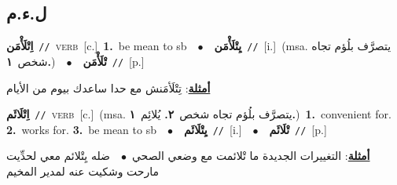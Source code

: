 \documentclass[10pt,a4paper,twoside]{article} %
\begin{document}
\begin{multicols}{2}
\vspace{-3mm}
\subsection*{\color{blue}\foreignlanguage{arabic}{ل.ء.م}\color{blue}{}} 

{\setlength\topsep{0pt}\textbf{\foreignlanguage{arabic}{اِتْلَأْمَن}}\ {\color{gray}\texttt{//}\color{black}}\ \textsc{verb}\ [c.]\ \textbf{1.}~be mean to sb\ \ $\bullet$\ \ \setlength\topsep{0pt}\textbf{\foreignlanguage{arabic}{يِتْلَأْمَن}}\ {\color{gray}\texttt{//}\color{black}}\ [i.]\ \color{gray}(msa. \foreignlanguage{arabic}{يتصرَّف بلُؤم تجاه شخص}~\foreignlanguage{arabic}{\textbf{١.}})\color{black}\ \ $\bullet$\ \ \setlength\topsep{0pt}\textbf{\foreignlanguage{arabic}{تْلَأْمَن}}\ {\color{gray}\texttt{//}\color{black}}\ [p.]\  \begin{flushright}\color{gray}\foreignlanguage{arabic}{\textbf{\underline{\foreignlanguage{arabic}{أمثلة}}}: تِتْلَأمَنش مع حدا ساعدك بيوم من الأيام}\end{flushright}\color{black}} \vspace{2mm}

{\setlength\topsep{0pt}\textbf{\foreignlanguage{arabic}{اِتْلَائَم}}\ {\color{gray}\texttt{//}\color{black}}\ \textsc{verb}\ [c.]\ \color{gray}(msa. \foreignlanguage{arabic}{يتصرَّف بلُؤم تجاه شخص}~\foreignlanguage{arabic}{\textbf{٢.}}  \foreignlanguage{arabic}{يُلائِم}~\foreignlanguage{arabic}{\textbf{١.}})\color{black}\ \textbf{1.}~convenient for.  \textbf{2.}~works for.  \textbf{3.}~be mean to sb\ \ $\bullet$\ \ \setlength\topsep{0pt}\textbf{\foreignlanguage{arabic}{يِتْلَائَم}}\ {\color{gray}\texttt{//}\color{black}}\ [i.]\ \ $\bullet$\ \ \setlength\topsep{0pt}\textbf{\foreignlanguage{arabic}{تْلَائَم}}\ {\color{gray}\texttt{//}\color{black}}\ [p.]\  \begin{flushright}\color{gray}\foreignlanguage{arabic}{\textbf{\underline{\foreignlanguage{arabic}{أمثلة}}}: التغييرات الجديدة ما تْلائمت مع وضعي الصحي\ $\bullet$\ \  ضله يِتْلائم معي لحدِّيت مارحت وشكيت عنه لمدير المخيم}\end{flushright}\color{black}} \vspace{2mm}


\end{multicols}
\end{document}
